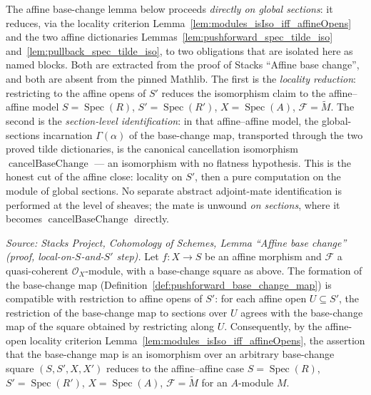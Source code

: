 The affine base-change lemma below proceeds \emph{directly on global sections}: it
reduces, via the locality criterion
Lemma~\ref{lem:modules_isIso_iff_affineOpens} and the two affine dictionaries
Lemmas~\ref{lem:pushforward_spec_tilde_iso} and~\ref{lem:pullback_spec_tilde_iso},
to two obligations that are isolated here as named blocks. Both are extracted from
the proof of Stacks ``Affine base change'', and both are absent from the pinned
Mathlib. The first is the \emph{locality reduction}: restricting to the affine opens
of \(S'\) reduces the isomorphism claim to the affine--affine model
\(S = \operatorname{Spec}(R)\), \(S' = \operatorname{Spec}(R')\),
\(X = \operatorname{Spec}(A)\), \(\mathcal{F} = \widetilde{M}\). The second is the
\emph{section-level identification}: in that affine--affine model, the global-sections
incarnation \(\Gamma(\alpha)\) of the base-change map, transported through the two
proved tilde dictionaries, is the canonical cancellation isomorphism
\(\operatorname{cancelBaseChange}\) — an isomorphism with no flatness hypothesis. This
is the honest cut of the affine close: locality on \(S'\), then a pure computation on
the module of global sections. No separate abstract adjoint-mate identification is
performed at the level of sheaves; the mate is unwound \emph{on sections}, where it
becomes \(\operatorname{cancelBaseChange}\) directly.

\begin{lemma}

  \label{lem:base_change_map_affine_local}
  \textit{Source: Stacks Project, Cohomology of Schemes, Lemma ``Affine base
  change'' (proof, local-on-\(S\)-and-\(S'\) step).}
  Let \(f : X \to S\) be an affine morphism and \(\mathcal{F}\) a quasi-coherent
  \(\mathcal{O}_X\)-module, with a base-change square as above. The formation of the
  base-change map (Definition~\ref{def:pushforward_base_change_map}) is compatible
  with restriction to affine opens of \(S'\): for each affine open \(U \subseteq S'\), the
  restriction of the base-change map to sections over \(U\) agrees with the
  base-change map of the square obtained by restricting along \(U\). Consequently,
  by the affine-open locality criterion
  Lemma~\ref{lem:modules_isIso_iff_affineOpens}, the assertion that the base-change
  map is an isomorphism over an arbitrary base-change square \((S, S', X, X')\)
  reduces to the affine--affine case \(S = \operatorname{Spec}(R)\),
  \(S' = \operatorname{Spec}(R')\), \(X = \operatorname{Spec}(A)\),
  \(\mathcal{F} = \widetilde{M}\) for an \(A\)-module \(M\).

\end{lemma}

